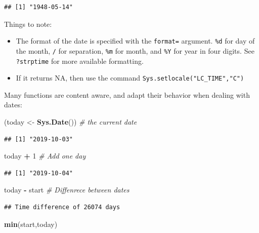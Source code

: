 \documentclass[]{book}
\newenvironment{Shaded}{\begin{snugshade}}{\end{snugshade}}
\newcommand{\CommentTok}[1]{\textcolor[rgb]{0.56,0.35,0.01}{\textit{#1}}}
\newcommand{\DecValTok}[1]{\textcolor[rgb]{0.00,0.00,0.81}{#1}}
\newcommand{\KeywordTok}[1]{\textcolor[rgb]{0.13,0.29,0.53}{\textbf{#1}}}
\newcommand{\NormalTok}[1]{#1}
\newcommand{\OperatorTok}[1]{\textcolor[rgb]{0.81,0.36,0.00}{\textbf{#1}}}
\newcommand{\StringTok}[1]{\textcolor[rgb]{0.31,0.60,0.02}{#1}}
\providecommand{\tightlist}{%
  \setlength{\itemsep}{0pt}\setlength{\parskip}{0pt}}
\theoremstyle{definition}
\theoremstyle{definition}
\theoremstyle{definition}
\theoremstyle{remark}
\begin{document}
\begin{verbatim}
## [1] "1948-05-14"
\end{verbatim}

Things to note:

\begin{itemize}
\tightlist
\item
  The format of the date is specified with the \texttt{format=} argument.
  \texttt{\%d} for day of the month, \texttt{/} for separation, \texttt{\%m} for month, and \texttt{\%Y} for year in four digits. See \texttt{?strptime} for more available formatting.
\item
  If it returns NA, then use the command \texttt{Sys.setlocale("LC\_TIME","C")}
\end{itemize}

Many functions are content aware, and adapt their behavior when dealing with dates:

\begin{Shaded}
\begin{Highlighting}[]
\NormalTok{(today <-}\StringTok{ }\KeywordTok{Sys.Date}\NormalTok{()) }\CommentTok{# the current date}
\end{Highlighting}
\end{Shaded}

\begin{verbatim}
## [1] "2019-10-03"
\end{verbatim}

\begin{Shaded}
\begin{Highlighting}[]
\NormalTok{today }\OperatorTok{+}\StringTok{ }\DecValTok{1} \CommentTok{# Add one day}
\end{Highlighting}
\end{Shaded}

\begin{verbatim}
## [1] "2019-10-04"
\end{verbatim}

\begin{Shaded}
\begin{Highlighting}[]
\NormalTok{today }\OperatorTok{-}\StringTok{ }\NormalTok{start }\CommentTok{# Diffenrece between dates}
\end{Highlighting}
\end{Shaded}

\begin{verbatim}
## Time difference of 26074 days
\end{verbatim}

\begin{Shaded}
\begin{Highlighting}[]
\KeywordTok{min}\NormalTok{(start,today)}
\end{Highlighting}
\end{Shaded}
\end{document}
